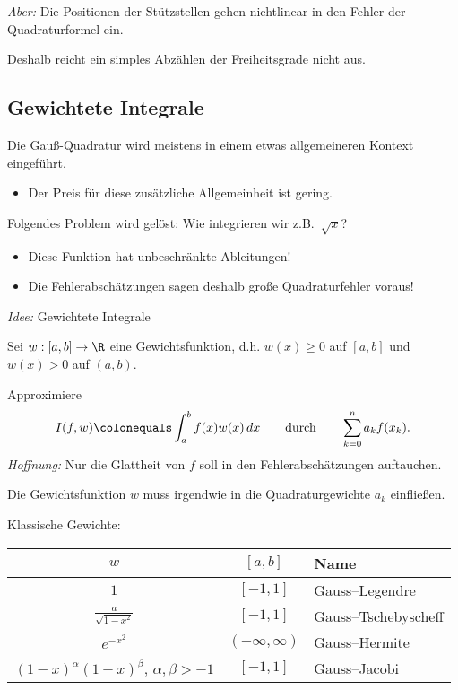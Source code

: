 \emph{Aber:} Die Positionen der Stützstellen gehen nichtlinear in den Fehler der Quadraturformel ein.

\medskip

Deshalb reicht ein simples Abzählen der Freiheitsgrade nicht aus.

\subsection{Gewichtete Integrale}

Die Gauß-Quadratur wird meistens in einem etwas allgemeineren Kontext eingeführt.
\begin{itemize}
 \item Der Preis für diese zusätzliche Allgemeinheit ist gering.
\end{itemize}

Folgendes Problem wird gelöst:  Wie integrieren wir z.B.\ $\sqrt{x}$?
\begin{itemize}
 \item Diese Funktion hat unbeschränkte Ableitungen!
 \item Die Fehlerabschätzungen sagen deshalb große Quadraturfehler voraus!
\end{itemize}

\emph{Idee:} Gewichtete Integrale

Sei $w: [a,b] \to \R$ eine Gewichtsfunktion, d.h. $w(x) \ge 0$ auf $[a,b]$ und $w(x) > 0$ auf $(a,b)$.

\medskip

Approximiere
\begin{equation*}
 I(f,w) \colonequals \int_a^b f(x)w(x)\,dx
 \qquad \text{durch} \qquad
 \sum_{k=0}^n a_k f(x_k).
\end{equation*}
\emph{Hoffnung:} Nur die Glattheit von $f$ soll in den Fehlerabschätzungen auftauchen.

Die Gewichtsfunktion $w$ muss irgendwie in die Quadraturgewichte $a_k$ einfließen.

\bigskip

\glqq Klassische\grqq{} Gewichte:
\begin{center}
\begin{tabular}{ c | c | l }
   $w$ & $[a,b]$ & Name \\
   \hline
  $1$ & $[-1,1]$ & Gauss--Legendre\\
  $\frac{a}{\sqrt{1-x^2}}$ & $[-1,1]$ &Gauss--Tschebyscheff \\
  $e^{-x^2}$ & $ (-\infty, \infty)$& Gauss--Hermite \\
  $(1-x)^\alpha (1+x)^\beta$, \quad $\alpha, \beta > -1$ & $ [-1,1]$ & Gauss--Jacobi
\end{tabular}
\end{center}

